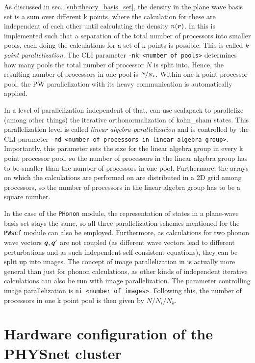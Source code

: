 \documentclass[main.tex]{subfiles}
\begin{document}
As discussed in sec. \ref{sub:theory_basis_set}, the density in the plane wave basis set is a sum over different k points, where the calculation for these are independent of each other until calculating the density \(n( \vb*{r})\).
In \QE this is implemented such that a separation of the total number of processors into smaller pools, each doing the calculations for a set of k points is possible.
This is called \emph{k point parallelization}.
The CLI parameter \texttt{-nk <number of pools>} determines how many pools the total number of processor \(N\) is split into.
Hence, the resulting number of processors in one pool is \(\nicefrac{N}{N_k}\).
Within one k point processor pool, the PW parallelization with its heavy communication is automatically applied.

In a level of parallelization independent of that, \QE can use \gls{scalapack} to parallelize (among other things) the iterative orthonormalization of \acrshort{kohn_sham} states.
This parallelization level is called \emph{linear algebra parallelization} and is controlled by the CLI parameter \texttt{-nd <number of processors in linear algebra group>}.
Importantly, this parameter sets the size for the linear algebra group in every k point processor pool, so the number of processors in the linear algebra group has to be smaller than the number of processors in one pool.
Furthermore, the arrays on which the calculations are performed on are distributed in a 2D grid among processors, so the number of processors in the linear algebra group has to be a square number.

In the case of the \texttt{PHonon} module, the representation of states in a plane-wave basis set stays the same, so all three parallelization schemes mentioned for the \texttt{PWscf} module can also be employed.
Furthermore, as calculations for two phonon wave vectors \(\vb*{q}, \vb*{q}^{\prime}\) are not coupled (as different wave vectors lead to different perturbations and as such independent self-consistent equations), they can be split up into images.
The concept of image parallelization in \QE is actually more general than just for phonon calculations, as other kinds of independent iterative calculations can also be run with image parallelization.
The parameter controlling image parallelization is \texttt{ni <number of images>}.
Following this, the number of processors in one k point pool is then given by \(N / N_i / N_k\).

\section{Hardware configuration of the PHYSnet cluster}\label{sec:hardware_physnet}
\end{document}
